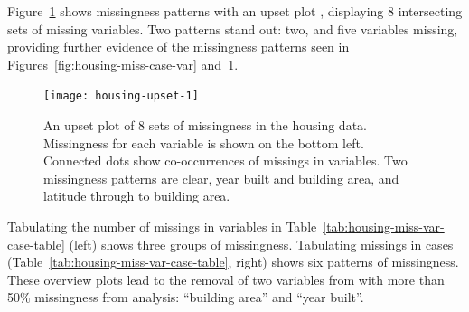 \documentclass[article]{jss}
\begin{document}
Figure~\ref{fig:housing-upset} shows missingness patterns with an upset
plot \citep{Conway2017}, displaying 8 intersecting sets of missing
variables.  Two patterns stand out: two, and five variables missing,
providing further evidence of the missingness patterns seen in
Figures~\ref{fig:housing-miss-case-var} and~\ref{fig:housing-upset}.

\begin{figure}[t!]
\centering
\texttt{[image: housing-upset-1]}
\caption[An upset plot of 8 sets of missingness in the housing data]{An
upset plot of 8 sets of missingness in the housing data.  Missingness for
each variable is shown on the bottom left.  Connected dots show
co-occurrences of missings in variables.  Two missingness patterns are clear,
year built and building area, and latitude through to building
area.}\label{fig:housing-upset}
\end{figure}

Tabulating the number of missings in variables in
Table~\ref{tab:housing-miss-var-case-table} (left) shows three groups of
missingness.  Tabulating missings in cases
(Table~\ref{tab:housing-miss-var-case-table}, right) shows six patterns of
missingness.  These overview plots lead to the removal of two variables from
with more than 50\% missingness from analysis: ``building area'' and ``year
built''.
\end{document}
